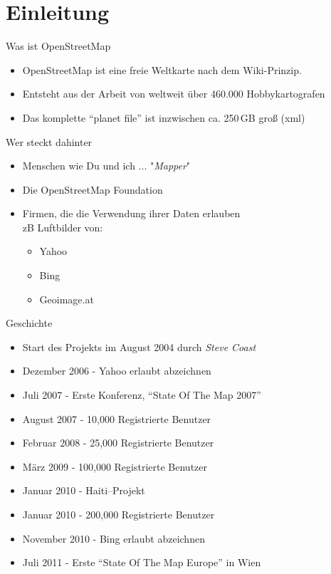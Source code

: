\documentclass{beamer}
\begin{document}
\section{Einleitung}

\begin{frame}{Was ist OpenStreetMap}

\begin{itemize}
  \item OpenStreetMap ist eine freie Weltkarte nach dem Wiki-Prinzip.
  \item Entsteht aus der Arbeit von weltweit über 460.000 Hobbykartografen
  \item Das komplette ``planet file'' ist inzwischen ca. 250\,GB groß (xml)
\end{itemize}


\end{frame}

\begin{frame}{Wer steckt dahinter}
  \begin{itemize}
    \item Menschen wie Du und ich ... "\emph{Mapper}"
    \item Die OpenStreetMap Foundation
    \item Firmen, die die Verwendung ihrer Daten erlauben \\
    zB Luftbilder von:
    \begin{itemize}
      \item Yahoo
      \item Bing
      \item Geoimage.at
    \end{itemize}
  \end{itemize}

\end{frame}

\begin{frame}{Geschichte}

\begin{itemize}
  \item Start des Projekts im August 2004 durch \emph{Steve Coast}
  \item Dezember 2006 - Yahoo erlaubt abzeichnen
  \item Juli 2007 - Erste Konferenz, ``State Of The Map 2007''
  \item August 2007 - 10,000 Registrierte Benutzer
  \item Februar 2008 - 25,000 Registrierte Benutzer
  \item März 2009 - 100,000 Registrierte Benutzer
  \item Januar 2010 - Haiti--Projekt
  \item Januar 2010 - 200,000 Registrierte Benutzer
  \item November 2010 - Bing erlaubt abzeichnen
  \item Juli 2011 - Erste ``State Of The Map Europe'' in Wien
\end{itemize}


\end{frame}
\end{document}
